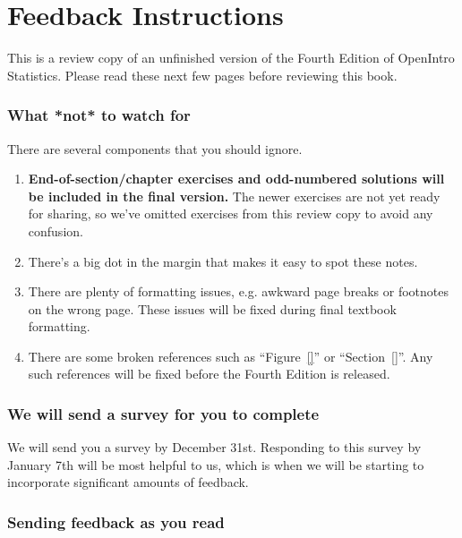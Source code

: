\chapter*{Feedback Instructions}

This is a review copy of an unfinished version of the
Fourth Edition of OpenIntro Statistics.
Please read these next few pages before reviewing this book.


\subsection*{What *not* to watch for}

\noindent%
There are several components that you should ignore.
\begin{enumerate}
\setlength{\itemsep}{0mm}
\item
    \textbf{End-of-section/chapter exercises
    and odd-numbered solutions will be included
    in the final version.}
    The newer exercises are not yet ready for sharing,
    so we've omitted exercises from this review copy
    to avoid any confusion.
\item
    There's a big dot in the margin that makes it easy
    to spot these notes.
\item
    There are plenty of formatting issues,
    e.g. awkward page breaks or footnotes on the wrong page.
    These issues will be fixed during final textbook formatting.
\item
    There are some broken references such as
    ``Figure~\ref{}'' or ``Section~\ref{}''.
    Any such references will be fixed before
    the Fourth Edition is released.
\end{enumerate}


\subsection*{We will send a survey for you to complete}

\noindent%
We will send you a survey by December 31st.
Responding to this survey by January 7th will be most
helpful to us, which is when we will be starting to
incorporate significant amounts of feedback.


\subsection*{Sending feedback as you read}

